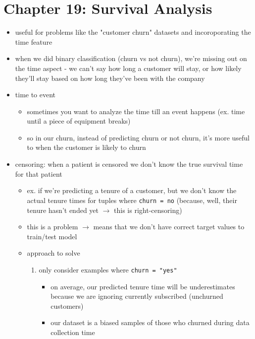 \documentclass[10.5pt,a4paper, fleqn, dvipsnames]{article}
\makeatletter
\newcommand*{\sectionbookmark}[1][]{%
  \bookmark[%
    level=section,%
    dest=\@currentHref,%
    #1%
  ]%
}
\makeatother
\begin{document}
\section*{Chapter 19: Survival Analysis}
\sectionbookmark{Chapter 19: Survival Analysis}
\begin{itemize}
    \item useful for problems like the "customer churn" datasets and incoroporating the time feature
    \item when we did binary classification (churn vs not churn), we're missing out on the time aspect - we can't say how long a customer will stay, or how likely they'll stay based on how long they've been with the company 
    \item time to event
    \begin{itemize}
        \item sometimes you want to analyze the time till an event happens (ex. time until a piece of equipment breaks) 
        \item so in our churn, instead of predicting churn or not churn, it's more useful to when the customer is likely to churn 
    \end{itemize}
    \item censoring: when a patient is censored we don’t know the true survival time for that patient
    \begin{itemize}
        \item ex. if we're predicting a tenure of a customer, but we don't know the actual tenure times for tuples where \lstinline{churn = no} (because, well, their tenure hasn't ended yet $\rightarrow$ this is right-censoring)
        \item this is a problem $\rightarrow$ means that we don't have correct target values to train/test model
        \item approach to solve
        \begin{enumerate}[leftmargin = 2em]
            \item only consider examples where \lstinline{churn = "yes"}
            \begin{itemize}[leftmargin = 1.5em]
                \item on average, our predicted tenure time will be underestimates because we are ignoring currently subscribed (unchurned customers)
                \item our dataset is a biased samples of those who churned during data collection time
            \end{itemize}

\end{enumerate}
\end{itemize}
\end{itemize}
\end{document}
